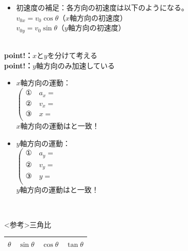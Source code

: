 \documentclass[11pt,twoside]{article}
\begin{document}
\begin{minipage}[t]{0.52\linewidth}
\begin{itemize}[leftmargin=2em,itemsep=0pt,topsep=2pt]
					\item[(iv)]
					初速度の補足：各方向の初速度は以下のようになる。\\
					$v_{0x} = v_0\cos\theta$（$x$軸方向の初速度）\\
					$v_{0y} = v_0\sin\theta$（$y$軸方向の初速度）\\
				\end{itemize}
			　\\
			\textbf{point!：}$x$と$y$を分けて考える\\
			\textbf{point!：}$y$軸方向のみ加速している
			\begin{itemize}[leftmargin=2em,itemsep=0pt,topsep=2pt]
				\item[(i)]
				$x$軸方向の運動：\\
				\(
				\left(
				\begin{array}{ll}
					\text{①} \quad a_x = & \\
					\text{②} \quad v_x = & \\
					\text{③} \quad x = & \\
				\end{array}
				\right.
				\)\\
				\to $x$軸方向の運動は\underline{\hspace{3.5cm}}と一致！\\
				\item[(ii)]
				$y$軸方向の運動：\\
				\(
				\left(
				\begin{array}{ll}
					\text{①} \quad a_y = & \\
					\text{②} \quad v_y = & \\
					\text{③} \quad y = & \\
				\end{array}
				\right.
				\)\\
				\to $y$軸方向の運動は\underline{\hspace{3.5cm}}と一致！
			\end{itemize}
			　\\
			\begin{itembox}[l]{<参考>三角比}
				\begin{minipage}[t]{0.4\linewidth}
				\end{minipage}
				\begin{minipage}[t]{0.6\linewidth}
					\begin{tabular}{|c|c|c|c|}\hline
						$\theta$ & $\sin\theta$ & $\cos\theta$ & $\tan\theta$ \\\hline

\end{tabular}
\end{minipage}
\end{itembox}
\end{minipage}
\end{document}
